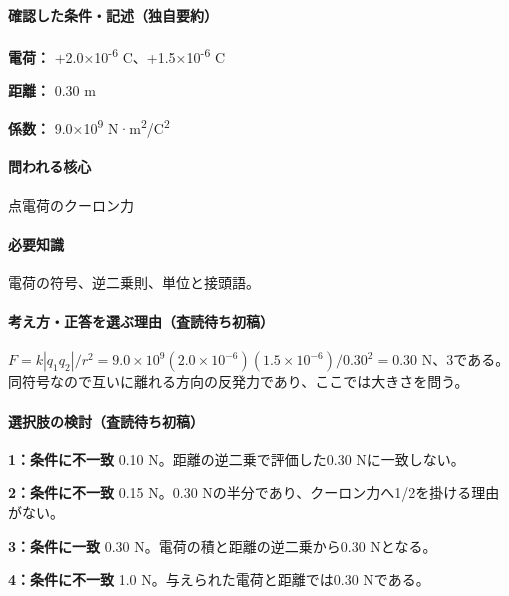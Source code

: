 \paragraph{確認した条件・記述（独自要約）}\mbox{}\par

\noindent\textbf{電荷：} +2.0×10\textsuperscript{-6} C、+1.5×10\textsuperscript{-6} C\par

\noindent\textbf{距離：} 0.30 m\par

\noindent\textbf{係数：} 9.0×10\textsuperscript{9} N·m\textsuperscript{2}/C\textsuperscript{2}\par

\paragraph{問われる核心} 点電荷のクーロン力

\paragraph{必要知識} 電荷の符号、逆二乗則、単位と接頭語。

\paragraph{考え方・正答を選ぶ理由（査読待ち初稿）} \(F=k|q_1q_2|/r^2=9.0\times10^9(2.0\times10^{-6})(1.5\times10^{-6})/0.30^2=0.30\) N、3である。同符号なので互いに離れる方向の反発力であり、ここでは大きさを問う。

\paragraph{選択肢の検討（査読待ち初稿）}\mbox{}\par

\noindent\textbf{1：条件に不一致} 0.10 N。距離の逆二乗で評価した0.30 Nに一致しない。\par

\noindent\textbf{2：条件に不一致} 0.15 N。0.30 Nの半分であり、クーロン力へ1/2を掛ける理由がない。\par

\noindent\textbf{3：条件に一致} 0.30 N。電荷の積と距離の逆二乗から0.30 Nとなる。\par

\noindent\textbf{4：条件に不一致} 1.0 N。与えられた電荷と距離では0.30 Nである。\par

